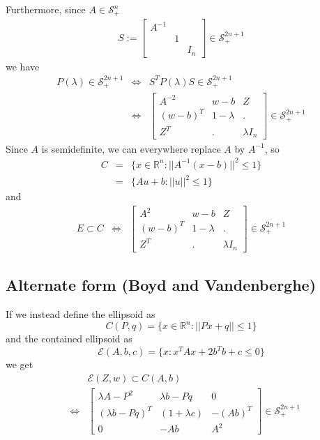\documentclass{article}
\begin{document}
Furthermore, since $A\in\mathcal{S}^n_+$
\begin{eqnarray}
S := \left[
    \begin{array}{ccc}
     A^{-1} \\
     & 1 \\
     && I_n
    \end{array}
\right]\in\mathcal{S}^{2n+1}_+
\end{eqnarray}
we have 
\begin{eqnarray}
    P(\lambda) \in \mathcal{S}^{2n+1}_+ 
    & \Leftrightarrow &
    S^T P(\lambda) S \in\mathcal{S}^{2n+1}_+ \\
    & \Leftrightarrow &
    \left[
        \begin{array}{ccc}
            A^{-2}  & w-b        & Z \\
            (w-b)^T & 1-\lambda  & . \\
            Z^T     & .          & \lambda I_n
        \end{array}
    \right]\in\mathcal{S}^{2n+1}_+
\end{eqnarray}
Since $A$ is semidefinite, we can everywhere replace $A$ by $A^{-1}$, so 
\begin{eqnarray}
C &=& \{ x\in\mathbb{R}^n : ||A^{-1}(x-b)||^2 \leq 1 \} \\
  &=& \{ Au+b: ||u||^2\leq 1 \} 
\end{eqnarray}
and 
\begin{eqnarray}
E \subset C &\Leftrightarrow& 
    \left[
        \begin{array}{ccc}
            A^2  & w-b           & Z \\
            (w-b)^T & 1-\lambda  & . \\
            Z^T     & .          & \lambda I_n
        \end{array}
    \right]\in\mathcal{S}^{2n+1}_+
\end{eqnarray}



\subsection{Alternate form (Boyd and Vandenberghe)}
If we instead define the ellipsoid as 
\[
    C(P,q) = \{ x\in\mathbb{R}^n : ||Px+q|| \leq 1 \}
\]
and the contained ellipsoid as 
\[
    \mathcal{E} (A,b,c) = \{ x : x^TAx + 2b^Tb + c \leq 0\}
\]
we get
\begin{eqnarray}
    && \mathcal{E} (Z,w) \subset C(A,b) \\
    &\Leftrightarrow& 
    \left[
        \begin{array}{ccc}
            \lambda A -P^2 & \lambda b-Pq& 0 \\
            (\lambda b-Pq)^T & (1+\lambda c) & -(Ab)^T \\
            0 & -Ab & A^2
        \end{array}
    \right]\in\mathcal{S}^{2n+1}_+
\end{eqnarray}
\end{document}
